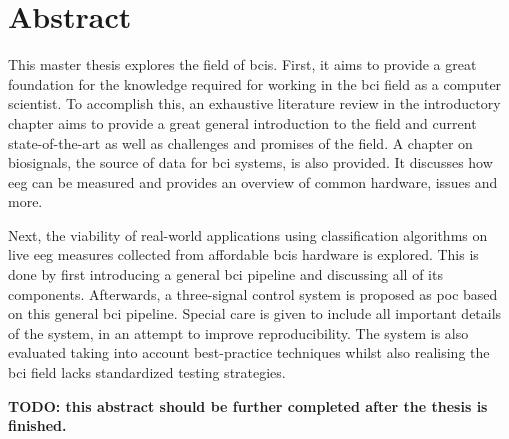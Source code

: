 
\chapter{Abstract}
\label{ch:abstract}

This master thesis explores the field of \glspl{bci}.
First, it aims to provide a great foundation for the knowledge required for working in the \gls{bci} field as a computer scientist.
To accomplish this, an exhaustive literature review in the introductory chapter aims to provide a great general introduction to the field and current state-of-the-art as well as challenges and promises of the field.
A chapter on \glspl{biosignal}, the source of data for \gls{bci} systems, is also provided.
It discusses how \gls{eeg} can be measured and provides an overview of common hardware, issues and more.

Next, the viability of real-world applications using classification algorithms on live \gls{eeg} measures collected from affordable \glspl{bci} hardware is explored.
This is done by first introducing a general \gls{bci} pipeline and discussing all of its components.
Afterwards, a three-signal control system is proposed as \gls{poc} based on this general \gls{bci} pipeline.
Special care is given to include all important details of the system, in an attempt to improve reproducibility.
The system is also evaluated taking into account best-practice techniques whilst also realising the \gls{bci} field lacks standardized testing strategies.

\textbf{TODO: this abstract should be further completed after the thesis is finished.}
